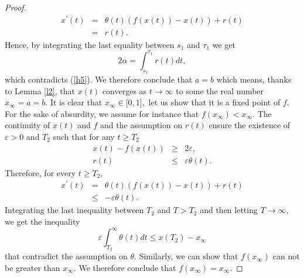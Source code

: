 \documentclass[11pt]{amsart}%
\theoremstyle{plain}
\numberwithin{equation}{section}
\begin{document}
\begin{proof}
\begin{eqnarray*}
x^{\prime }(t) &=&\theta (t)(f(x(t))-x(t))+r(t) \\
&=&r(t).
\end{eqnarray*}%
Hence, by integrating the last equality between $s_{1}$ and $\tau _{1}$ we
get
\[
2\alpha =\int_{s_{1}}^{\tau _{1}}r(t)dt,
\]%
which contradicts (\ref{h5}). We therefore conclude that $a=b$ which means,
thanks to Lemma \ref{l2}, that $x(t)$ converges as $t\rightarrow \infty $ to some the
real number $x_{\infty }=a=b.$ It is clear that $x_{\infty }\in
\lbrack 0,1],$ let us show that it is a fixed point of $f.$ For the sake of
absurdity, we assume for instance that $f(x_{\infty })<x_{\infty }.$ The
continuity of $x(t)$ and $f$ and the assumption on $r(t)$ ensure the
existence of $\varepsilon >0$ and $T_{2}$ such that for any $t\geq T_{2}$%
\begin{eqnarray*}
x(t)-f(x(t)) &\geq &2\varepsilon , \\
r(t) &\leq &\varepsilon \theta (t).
\end{eqnarray*}%
Therefore, for every $t\geq T_{2},$
\begin{eqnarray*}
x^{\prime }(t) &=&\theta (t)(f(x(t))-x(t))+r(t) \\
&\leq &-\varepsilon \theta (t).
\end{eqnarray*}%
Integrating the last inequality between $T_{2}$ and $T>T_{2}$ and then letting $%
T\rightarrow \infty ,$ we get the inequality%
\[
\varepsilon \int_{T_{2}}^{\infty }\theta (t)dt\leq x(T_{2})-x_{\infty }
\]%
that contradict the assumption on $\theta .$ Similarly, we can show that
$f(x_{\infty })$ can not be greater than $x_{\infty }.$ We therefore
conclude that $f(x_{\infty })=x_{\infty }.$
\end{proof}
\end{document}
